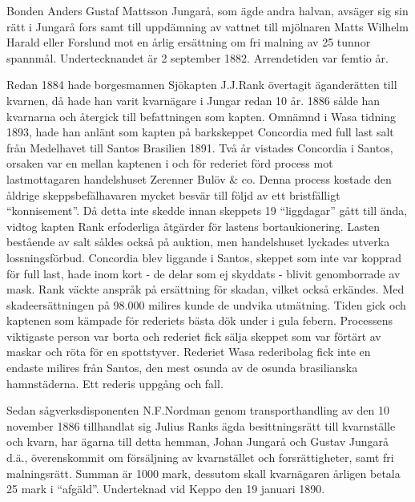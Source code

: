 Bonden Anders Gustaf Mattsson Jungarå, som ägde andra halvan, avsäger sig sin rätt i Jungarå fors samt till uppdämning av vattnet till mjölnaren Matts Wilhelm Harald eller Forslund mot en årlig ersättning om fri malning av 25 tunnor 	spannmål. Undertecknandet är 2 september 1882. Arrendetiden var femtio år.


Redan 1884 hade borgesmannen Sjökapten J.J.Rank övertagit äganderätten till kvarnen, då hade han varit kvarnägare i Jungar redan 10 år. 1886 sålde han kvarnarna och återgick till befattningen som kapten. Omnämnd i Wasa tidning 1893, hade han anlänt som kapten på barkskeppet Concordia med full last salt från Medelhavet till Santos Brasilien 1891. Två år vistades Concordia i Santos, orsaken var en mellan kaptenen i och för rederiet förd process mot lastmottagaren handelshuset Zerenner Bulöv \& co. Denna process kostade den åldrige skeppsbefälhavaren mycket besvär till följd av ett bristfälligt ``konnisement''. Då detta inte skedde innan skeppets 19 ``liggdagar'' gått till ända, vidtog kapten Rank erfoderliga åtgärder för lastens bortaukionering. Lasten bestående av salt såldes också på auktion, men handelshuset lyckades utverka lossningsförbud. Concordia blev liggande i Santos, skeppet som inte var kopprad för full last, hade inom kort - de delar som ej skyddats - blivit genomborrade av mask. Rank väckte anspråk på ersättning för skadan, vilket också erkändes. Med skadeersättningen på 98.000 milires kunde de undvika utmätning. Tiden gick och kaptenen som kämpade för rederiets bästa dök under i gula febern. Processens viktigaste person var borta och rederiet fick sälja skeppet som var förtärt av maskar och röta för en spottstyver. Rederiet Wasa rederibolag fick inte en endaste milires från Santos, den mest osunda av de osunda brasilianska hamnstäderna. Ett rederis uppgång och fall.

Sedan sågverksdisponenten N.F.Nordman genom transporthandling av den 10 november 1886 tillhandlat sig Julius Ranks ägda besittningsrätt till kvarnställe och kvarn, har ägarna till detta hemman, Johan Jungarå och Gustav Jungarå d.ä., överenskommit om försäljning av kvarnstället och forsrättigheter, samt fri malningsrätt. Summan är 1000 mark, dessutom skall kvarnägaren årligen betala 25 mark i ``afgäld''. Underteknad vid Keppo den 19 januari 1890.





